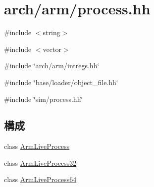 \hypertarget{arch_2arm_2process_8hh}{
\section{arch/arm/process.hh}
\label{arch_2arm_2process_8hh}
}
{\ttfamily \#include $<$string$>$}\par
{\ttfamily \#include $<$vector$>$}\par
{\ttfamily \#include \char`\"{}arch/arm/intregs.hh\char`\"{}}\par
{\ttfamily \#include \char`\"{}base/loader/object\_\-file.hh\char`\"{}}\par
{\ttfamily \#include \char`\"{}sim/process.hh\char`\"{}}\par
\subsection*{構成}
\begin{DoxyCompactItemize}
\item 
class \hyperlink{classArmLiveProcess}{ArmLiveProcess}
\item 
class \hyperlink{classArmLiveProcess32}{ArmLiveProcess32}
\item 
class \hyperlink{classArmLiveProcess64}{ArmLiveProcess64}
\end{DoxyCompactItemize}
